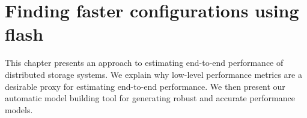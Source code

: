 \chapter{Finding faster configurations using flash}
\label{chapter:flash}

This chapter presents an approach to estimating end-to-end performance
of distributed storage systems.
We explain why low-level performance metrics are a desirable proxy
for estimating end-to-end performance.
We then present our automatic model building tool for generating
robust and accurate performance models.

% 
% 
% 
% 
% 
